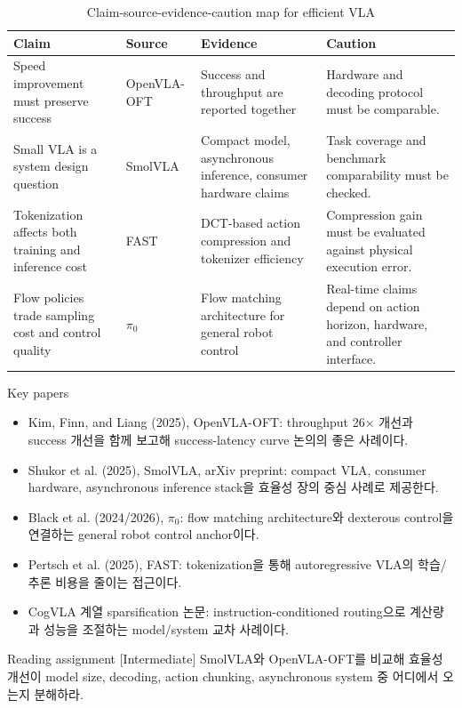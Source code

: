 \begin{table}[t]
  \centering
  \small
  \caption{Claim-source-evidence-caution map for efficient VLA}
  \label{tab:ch6_claim_source}
  \begin{tabularx}{\textwidth}{L{31mm}L{28mm}L{48mm}Y}
    \toprule
    Claim & Source & Evidence & Caution \\
    \midrule
    Speed improvement must preserve success & OpenVLA-OFT \citep{openvlaoft} & Success and throughput are reported together & Hardware and decoding protocol must be comparable. \\
    Small VLA is a system design question & SmolVLA \citep{smolvla} & Compact model, asynchronous inference, consumer hardware claims & Task coverage and benchmark comparability must be checked. \\
    Tokenization affects both training and inference cost & FAST \citep{fast} & DCT-based action compression and tokenizer efficiency & Compression gain must be evaluated against physical execution error. \\
    Flow policies trade sampling cost and control quality & \(\pi_0\) \citep{pi0} & Flow matching architecture for general robot control & Real-time claims depend on action horizon, hardware, and controller interface. \\
    \bottomrule
  \end{tabularx}
\end{table}

\begin{sourcebox}{Key papers}
\begin{itemize}
  \item Kim, Finn, and Liang (2025), OpenVLA-OFT: throughput 26\(\times\) 개선과 success 개선을 함께 보고해 success-latency curve 논의의 좋은 사례이다.
  \item Shukor et al. (2025), SmolVLA, arXiv preprint: compact VLA, consumer hardware, asynchronous inference stack을 효율성 장의 중심 사례로 제공한다.
  \item Black et al. (2024/2026), \(\pi_0\): flow matching architecture와 dexterous control을 연결하는 general robot control anchor이다.
  \item Pertsch et al. (2025), FAST: tokenization을 통해 autoregressive VLA의 학습/추론 비용을 줄이는 접근이다.
  \item CogVLA 계열 sparsification 논문: instruction-conditioned routing으로 계산량과 성능을 조절하는 model/system 교차 사례이다.
\end{itemize}
\end{sourcebox}

\begin{assignmentbox}{Reading assignment [Intermediate]}
SmolVLA와 OpenVLA-OFT를 비교해 효율성 개선이 model size, decoding, action chunking, asynchronous system 중 어디에서 오는지 분해하라.
\end{assignmentbox}
